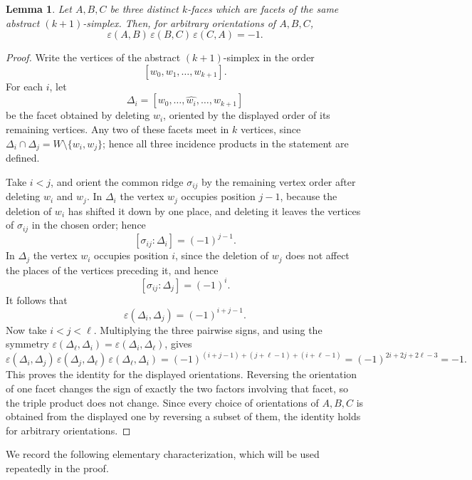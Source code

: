 \documentclass[11pt,reqno]{amsart}
\numberwithin{equation}{section}
\theoremstyle{plain}
\newtheorem{lemma}[theorem]{Lemma}
\theoremstyle{definition}
\newcommand{\eps}{\varepsilon}
\begin{document}
\begin{lemma}\label{lem:sign}
Let $A,B,C$ be three distinct $k$-faces which are facets of the same abstract
$(k+1)$-simplex. Then, for arbitrary orientations of $A,B,C$,
\[
  \eps(A,B)\,\eps(B,C)\,\eps(C,A)=-1 .
\]
\end{lemma}

\begin{proof}
Write the vertices of the abstract $(k+1)$-simplex in the order
\[
  [w_0,w_1,\dots,w_{k+1}] .
\]
For each $i$, let
\[
  \Delta_i=[w_0,\dots,\widehat{w_i},\dots,w_{k+1}]
\]
be the facet obtained by deleting $w_i$, oriented by the displayed order of its remaining
vertices. Any two of these facets meet in $k$ vertices, since
$\Delta_i\cap\Delta_j=W\setminus\{w_i,w_j\}$; hence all three incidence products in the
statement are defined.

Take $i<j$, and orient the common ridge $\sigma_{ij}$ by the remaining vertex order after
deleting $w_i$ and $w_j$. In $\Delta_i$ the vertex $w_j$ occupies position $j-1$, because the
deletion of $w_i$ has shifted it down by one place, and deleting it leaves the vertices of
$\sigma_{ij}$ in the chosen order; hence
\[
  [\sigma_{ij}:\Delta_i]={(-1)}^{j-1}.
\]
In $\Delta_j$ the vertex $w_i$ occupies position $i$, since the deletion of $w_j$ does not
affect the places of the vertices preceding it, and hence
\[
  [\sigma_{ij}:\Delta_j]={(-1)}^{i}.
\]
It follows that
\[
  \eps(\Delta_i,\Delta_j)={(-1)}^{i+j-1}.
\]
Now take $i<j<\ell$. Multiplying the three pairwise signs, and using the symmetry
$\eps(\Delta_\ell,\Delta_i)=\eps(\Delta_i,\Delta_\ell)$, gives
\[
  \eps(\Delta_i,\Delta_j)\,\eps(\Delta_j,\Delta_\ell)\,\eps(\Delta_\ell,\Delta_i)
  ={(-1)}^{(i+j-1)+(j+\ell-1)+(i+\ell-1)}={(-1)}^{2i+2j+2\ell-3}=-1 .
\]
This proves the identity for the displayed orientations. Reversing the orientation of one facet
changes the sign of exactly the two factors involving that facet, so the triple product does
not change. Since every choice of orientations of $A,B,C$ is obtained from the displayed one by
reversing a subset of them, the identity holds for arbitrary orientations.
\end{proof}



We record the following elementary characterization, which will be used repeatedly in the proof.
\end{document}
